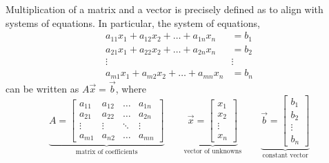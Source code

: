 \documentclass[letterpaper,12pt]{article}
\begin{document}
Multiplication of a matrix and a vector is precisely defined as to align with systems of equations. In particular, the system of equations,
\begin{align*}
    a_{11}x_1 + a_{12}x_2 + \dots + a_{1n}x_n & = b_1 \\
    a_{21}x_1 + a_{22}x_2 + \dots + a_{2n}x_n & = b_2 \\
    \vdots \qquad \qquad \qquad \qquad \qquad & \vdots \\
    a_{m1}x_1 + a_{m2}x_2 + \dots + a_{mn}x_n & = b_n
\end{align*}
can be written as $A\vec{x} = \vec{b}$, where
\begin{equation*}
    \underbrace{A = \begin{bmatrix}
    a_{11} & a_{12} & \dots & a_{1n} \\
    a_{21} & a_{22} & \dots & a_{2n} \\
    \vdots & \vdots & \ddots & \vdots \\
    a_{m1} & a_{n2} & \dots & a_{mn}
    \end{bmatrix}}_{\text{matrix of coefficients}}
    \qquad
    \underbrace{\vec{x} = \begin{bmatrix} x_1 \\ x_2 \\ \vdots \\ x_n \end{bmatrix}}_{\text{vector of unknowns}} \qquad \underbrace{\vec{b} = \begin{bmatrix} b_1 \\ b_2 \\ \vdots \\ b_n \end{bmatrix}}_{\text{constant vector}}
\end{equation*}
    
\end{document}
